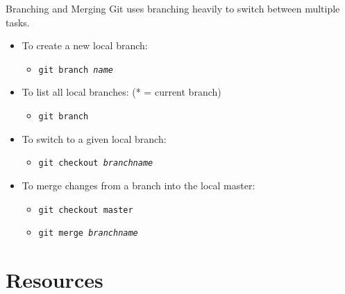 \documentclass[aspectratio=169,11pt,t]{beamer}
\newcommand{\cmd}[1]{\textcolor{cmdcol}{\texttt{#1}}}    %
\newcommand{\ph}[1]{\textit{#1}}                         %
\newcommand{\dividerslide}[1]{%
  \begin{frame}[c]
    \centering{\LARGE\color{accent}#1\par}
  \end{frame}}
\begin{document}
\begin{frame}{Branching and Merging}
  \small
  \hspace*{3mm}Git uses branching heavily to switch between multiple tasks.
  \begin{itemize}
    \item To create a new local branch:
      \begin{itemize}\item \cmd{git branch \ph{name}}\end{itemize}
    \item To list all local branches: (* = current branch)
      \begin{itemize}\item \cmd{git branch}\end{itemize}
    \item To switch to a given local branch:
      \begin{itemize}\item \cmd{git checkout \ph{branchname}}\end{itemize}
    \item To merge changes from a branch into the local master:
      \begin{itemize}
        \item \cmd{git checkout master}
        \item \cmd{git merge \ph{branchname}}
      \end{itemize}
  \end{itemize}
\end{frame}

\section{Resources}
\dividerslide{Resources}
\end{document}
